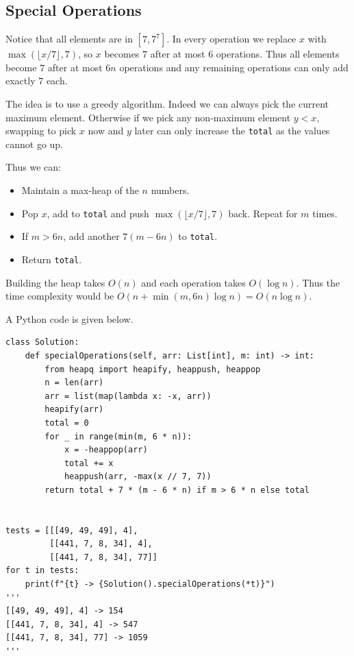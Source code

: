\documentclass[12pt]{article}
\renewcommand{\t}{\texttt}
\begin{document}
\subsection{Special Operations}
Notice that all elements are in $\left[7,7^7\right]$. In every operation we replace $x$ with $\max(\lfloor x/7\rfloor, 7)$, so $x$ becomes $7$ after at most $6$ operations. Thus all elements become $7$ after at most $6n$ operations and any remaining operations can only add exactly $7$ each.

The idea is to use a greedy algorithm. Indeed we can always pick the current maximum element. Otherwise if we pick any non-maximum element $y<x$, swapping to pick $x$ now and $y$ later can only increase the \t{total} as the values cannot go up.

Thus we can:
\begin{itemize}
\item Maintain a max-heap of the $n$ numbers.
\item Pop $x$, add to \t{total} and push $\max(\lfloor x/7\rfloor, 7)$ back. Repeat for $m$ times.
\item If $m>6n$, add another $7(m-6n)$ to \t{total}.
\item Return \t{total}.
\end{itemize}

Building the heap takes $O(n)$ and each operation takes $O(\log n)$. Thus the time complexity would be $O(n+\min(m,6n)\log n)=O(n\log n)$.

A Python code is given below.
\begin{verbatim}
class Solution:
    def specialOperations(self, arr: List[int], m: int) -> int:
        from heapq import heapify, heappush, heappop
        n = len(arr)
        arr = list(map(lambda x: -x, arr))
        heapify(arr)
        total = 0
        for _ in range(min(m, 6 * n)):
            x = -heappop(arr)
            total += x
            heappush(arr, -max(x // 7, 7))
        return total + 7 * (m - 6 * n) if m > 6 * n else total


tests = [[[49, 49, 49], 4],
         [[441, 7, 8, 34], 4],
         [[441, 7, 8, 34], 77]]
for t in tests:
    print(f"{t} -> {Solution().specialOperations(*t)}")
'''
[[49, 49, 49], 4] -> 154
[[441, 7, 8, 34], 4] -> 547
[[441, 7, 8, 34], 77] -> 1059
'''
\end{verbatim}
\end{document}
